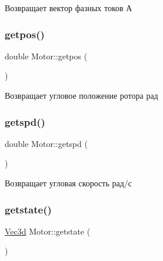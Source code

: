 \begin{DoxyReturn}{Возвращает}
вектор фазных токов А 
\end{DoxyReturn}
\mbox{\label{classMotor_a2252f262ca385e6a1ae217c9f2f9d282}} 
\subsubsection{\texorpdfstring{getpos()}{getpos()}}
{\footnotesize\ttfamily double Motor\+::getpos (\begin{DoxyParamCaption}{ }\end{DoxyParamCaption})\hspace{0.3cm}{\ttfamily [inline]}}

\begin{DoxyReturn}{Возвращает}
угловое положение ротора рад 
\end{DoxyReturn}
\mbox{\label{classMotor_aced401ab0a40ead568739392cea51748}} 
\subsubsection{\texorpdfstring{getspd()}{getspd()}}
{\footnotesize\ttfamily double Motor\+::getspd (\begin{DoxyParamCaption}{ }\end{DoxyParamCaption})\hspace{0.3cm}{\ttfamily [inline]}}

\begin{DoxyReturn}{Возвращает}
угловая скорость рад/с 
\end{DoxyReturn}
\mbox{\label{classMotor_a55899b432198761a45182151c5817df1}} 
\subsubsection{\texorpdfstring{getstate()}{getstate()}}
{\footnotesize\ttfamily \hyperlink{structVec3}{Vec3d} Motor\+::getstate (\begin{DoxyParamCaption}{ }\end{DoxyParamCaption})\hspace{0.3cm}{\ttfamily [inline]}}

